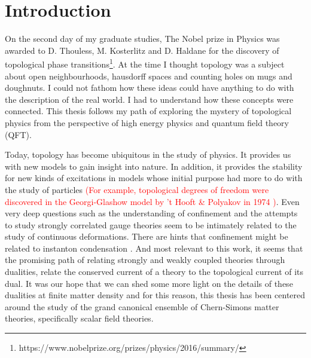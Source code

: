 
    \graphicspath{{Introduction_Folder/figures/PNG/}{Introduction_Folder/figures/PDF/}{Introduction_Folder/figures/}}

\chapter*{Introduction}


On the second day of my graduate studies, The Nobel prize in Physics was awarded to D. Thouless, M. Kosterlitz and D. Haldane for the discovery of topological phase transitions\footnote{https://www.nobelprize.org/prizes/physics/2016/summary/}. At the time I thought topology was a subject about open neighbourhoods, hausdorff spaces and counting holes on mugs and doughnuts. I could not fathom how these ideas could have anything to do with the description of the real world. I had to understand how these concepts were connected. This thesis follows my path of exploring the mystery of topological physics from the perspective of high energy physics and quantum field theory (QFT).

Today, topology has become ubiquitous in the study of physics. It provides us with new models to gain insight into nature. In addition, it provides the stability for new kinds of excitations in models whose initial purpose had more to do with the study of particles \textcolor{red}{(For example, topological degrees of freedom were discovered in the Georgi-Glashow model \cite{Georgi:1974sy} by 't Hooft \& Polyakov in 1974 \cite{Polyakov:1974ek, tHooft:1974kcl})}. Even very deep questions such as the understanding of confinement and the attempts to study strongly correlated gauge theories seem to be intimately related to the study of continuous deformations. There are hints that confinement might be related to instanton condensation \cite{Polyakov:1976fu}. And most relevant to this work, it seems that the promising path of relating strongly and weakly coupled theories through dualities, relate the conserved current of a theory to the topological current of its dual. It was our hope that we can shed some more light on the details of these dualities at finite matter density and for this reason, this thesis has been centered around the study of the grand canonical ensemble of Chern-Simons matter theories, specifically scalar field theories.

